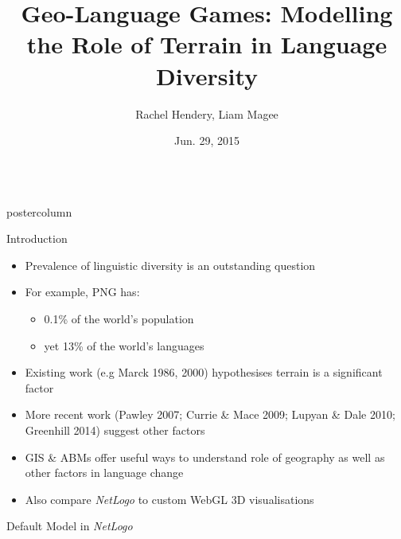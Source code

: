 \documentclass[final,hyperref={pdfpagelabels=false}]{beamer}
\title{\huge Geo-Language Games: Modelling the Role of Terrain in Language Diversity}
\author{Rachel Hendery, Liam Magee}
\institute[University of Western Sydney]{Digital Humanities Research Group, University of Western Sydney, Parramatta, Australia}
\date[Jun. 29, 2015]{Jun. 29, 2015}
\newlength{\columnheight}
\begin{document}
\begin{frame}
  \begin{columns}
    \begin{column}{.33\textwidth}
      \begin{beamercolorbox}[center,wd=\textwidth]{postercolumn}
        \begin{minipage}[T]{.95\textwidth}  %
          \parbox[t][\columnheight]{\textwidth}{ %
            \begin{block}{Introduction}
              \begin{itemize}
              \item Prevalence of linguistic diversity is an outstanding question
              \item For example, PNG has:
                \begin{itemize}
                \item 0.1\% of the world's population
                \item yet 13\% of the world's languages
                \end{itemize}
              \item Existing work (e.g Marck 1986, 2000) hypothesises terrain is a significant factor
              \item More recent work (Pawley 2007; Currie \& Mace 2009; Lupyan \& Dale 2010; Greenhill 2014) suggest other factors
              \item GIS \& ABMs offer useful ways to understand role of geography as well as other factors in language change
              \item Also compare \textit{NetLogo} to custom WebGL 3D visualisations
              \end{itemize}
            \end{block}
            \vfill
            \begin{block}{Default Model in \textit{NetLogo}}
              \begin{figure}
                \centering

\end{figure}
\end{block}}
\end{minipage}
\end{beamercolorbox}
\end{column}
\end{columns}
\end{frame}
\end{document}
